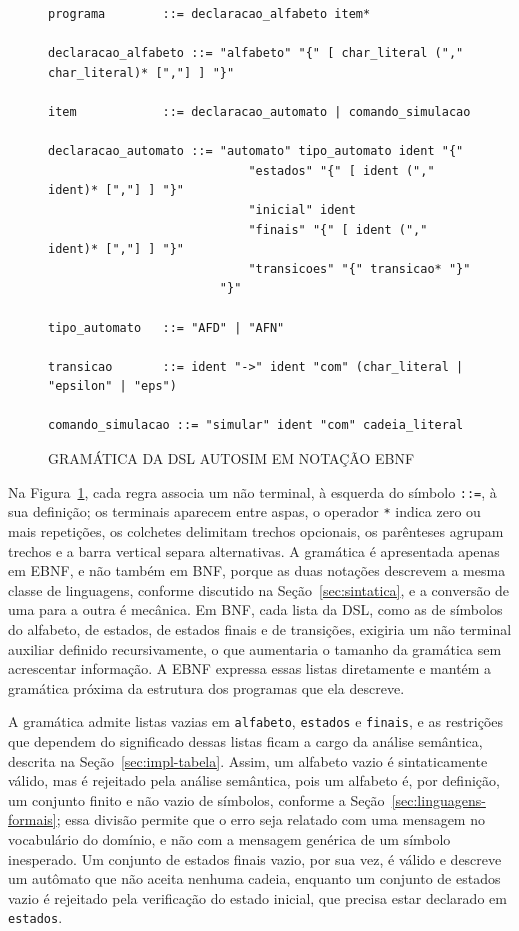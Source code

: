 \documentclass[
    12pt
    ,oneside
    ,a4paper
    ,chapter=TITLE
    ,section=TITLE
    ,sumario=abnt-6027-2012]{abntex2}
\begin{document}
\begin{figure}[htbp]
    \centering
    \caption{GRAMÁTICA DA DSL AUTOSIM EM NOTAÇÃO EBNF}
    \label{fig:gramatica-dsl}
    \begin{lstlisting}[basicstyle=\footnotesize\ttfamily,frame=single]
programa        ::= declaracao_alfabeto item*

declaracao_alfabeto ::= "alfabeto" "{" [ char_literal ("," char_literal)* [","] ] "}"

item            ::= declaracao_automato | comando_simulacao

declaracao_automato ::= "automato" tipo_automato ident "{"
                            "estados" "{" [ ident ("," ident)* [","] ] "}"
                            "inicial" ident
                            "finais" "{" [ ident ("," ident)* [","] ] "}"
                            "transicoes" "{" transicao* "}"
                        "}"

tipo_automato   ::= "AFD" | "AFN"

transicao       ::= ident "->" ident "com" (char_literal | "epsilon" | "eps")

comando_simulacao ::= "simular" ident "com" cadeia_literal
    \end{lstlisting}
\end{figure}
\FloatBarrier

Na Figura~\ref{fig:gramatica-dsl}, cada regra associa um não terminal, à esquerda do
símbolo \texttt{::=}, à sua definição; os terminais aparecem entre aspas, o operador
\texttt{*} indica zero ou mais repetições, os colchetes delimitam trechos opcionais, os
parênteses agrupam trechos e a barra vertical separa alternativas. A gramática é
apresentada apenas em EBNF, e não também em BNF, porque as duas notações descrevem a
mesma classe de linguagens, conforme discutido na Seção~\ref{sec:sintatica}, e a
conversão de uma para a outra é mecânica. Em BNF, cada lista da DSL, como as de símbolos
do alfabeto, de estados, de estados finais e de transições, exigiria um não terminal
auxiliar definido recursivamente, o que aumentaria o tamanho da gramática sem acrescentar
informação. A EBNF expressa essas listas diretamente e mantém a gramática próxima da
estrutura dos programas que ela descreve.

A gramática admite listas vazias em \texttt{alfabeto}, \texttt{estados} e \texttt{finais},
e as restrições que dependem do significado dessas listas ficam a cargo da análise
semântica, descrita na Seção~\ref{sec:impl-tabela}. Assim, um alfabeto vazio é
sintaticamente válido, mas é rejeitado pela análise semântica, pois um alfabeto é, por
definição, um conjunto finito e não vazio de símbolos, conforme a
Seção~\ref{sec:linguagens-formais}; essa divisão permite que o erro seja relatado com uma
mensagem no vocabulário do domínio, e não com a mensagem genérica de um símbolo
inesperado. Um conjunto de estados finais vazio, por sua vez, é válido e descreve um
autômato que não aceita nenhuma cadeia, enquanto um conjunto de estados vazio é rejeitado
pela verificação do estado inicial, que precisa estar declarado em \texttt{estados}.
\end{document}
